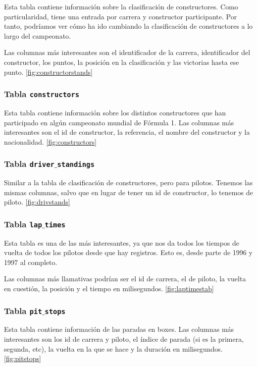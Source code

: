 \documentclass[12pt,twoside,titlepage]{report}
\begin{document}
Esta tabla contiene información sobre la clasificación de constructores. Como particularidad, tiene una entrada por carrera y constructor participante. Por tanto, podríamos ver cómo ha ido cambiando la clasificación de constructores a lo largo del campeonato.

Las columnas más interesantes son el identificador de la carrera, identificador del constructor, los puntos, la posición en la clasificación y las victorias hasta ese punto. \ref{fig:constructorstands}

\subsubsection{Tabla \texttt{constructors}}

Esta tabla contiene información sobre los distintos constructores que han participado en algún campeonato mundial de Fórmula 1. Las columnas más interesantes son el id de constructor, la referencia, el nombre del constructor y la nacionalidad. \ref{fig:constructors}

\subsubsection{Tabla \texttt{driver$\_$standings}}

Similar a la tabla de clasificación de constructores, pero para pilotos. Tenemos las mismas columnas, salvo que en lugar de tener un id de constructor, lo tenemos de piloto. \ref{fig:drivstands}

\subsubsection{Tabla \texttt{lap$\_$times}}

Esta tabla es una de las más interesantes, ya que nos da todos los tiempos de vuelta de todos los pilotos desde que hay registros. Esto es, desde parte de 1996 y 1997 al completo.

Las columnas más llamativas podrían ser el id de carrera, el de piloto, la vuelta en cuestión, la posición y el tiempo en milisegundos. \ref{fig:laptimestab}

\subsubsection{Tabla \texttt{pit$\_$stops}}

Esta tabla contiene información de las paradas en boxes. Las columnas más interesantes son los id de carrera y piloto, el índice de parada (si es la primera, segunda, etc), la vuelta en la que se hace y la duración en milisegundos. \ref{fig:pitstops}
\end{document}
